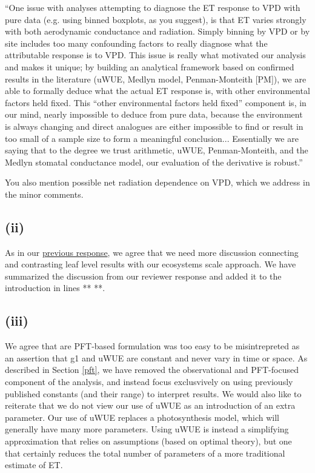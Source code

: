 \documentclass[12pt]{article}
\begin{document}
``One issue with analyses attempting to diagnose the ET response to
VPD with pure data (e.g. using binned boxplots, as you suggest), is
that ET varies strongly with both aerodynamic conductance and
radiation. Simply binning by VPD or by site includes too many
confounding factors to really diagnose what the attributable response
is to VPD. This issue is really what motivated our analysis and makes
it unique; by building an analytical framework based on confirmed
results in the literature (uWUE, Medlyn model, Penman-Monteith [PM]),
we are able to formally deduce what the actual ET response is, with
other environmental factors held fixed. This ``other environmental
factors held fixed'' component is, in our mind, nearly impossible to
deduce from pure data, because the environment is always changing and
direct analogues are either impossible to find or result in too small
of a sample size to form a meaningful conclusion... Essentially we are
saying that to the degree we trust arithmetic, uWUE, Penman-Monteith,
and the Medlyn stomatal conductance model, our evaluation of the
derivative is robust.''

You also mention possible net radiation dependence on VPD, which we
address in the minor comments.

\subsection{(ii)}

As in our
\href{https://www.hydrol-earth-syst-sci-discuss.net/hess-2018-553/hess-2018-553-AC2-supplement.pdf}{previous
  response}, we agree that we need more discussion connecting and
contrasting leaf level results with our ecosystems scale approach. We
have summarized the discussion from our reviewer response and added it
to the introduction in lines ** **.

\subsection{(iii)}

We agree that are PFT-based formulation was too easy to be
misintrepreted as an assertion that g1 and uWUE are constant and never
vary in time or space. As described in Section \ref{pft}, we have
removed the observational and PFT-focused component of the analysis,
and instead focus exclusvively on using previously published constants
(and their range) to interpret results. We would also like to
reiterate that we do not view our use of uWUE as an introduction of an
extra parameter. Our use of uWUE replaces a photosynthesis model,
which will generally have many more parameters. Using uWUE is instead
a simplifying approximation that relies on assumptions (based on
optimal theory), but one that certainly reduces the total number of
parameters of a more traditional estimate of ET.
\end{document}
